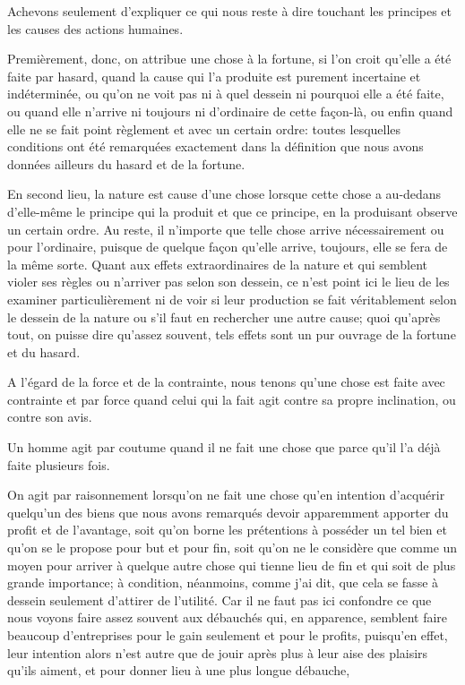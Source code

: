 Achevons seulement d'expliquer ce qui nous reste à dire touchant les principes et les causes des actions humaines.

\bigbreak

Premièrement, donc, on attribue une chose à la fortune, si l'on croit qu'elle a été faite par hasard, quand la cause qui l'a
produite est purement incertaine et indéterminée, ou qu'on ne voit pas ni à quel dessein ni pourquoi elle a été faite, ou quand
elle n'arrive ni toujours ni d'ordinaire de cette façon-là, ou enfin quand elle ne se fait point règlement et avec un certain
ordre: toutes lesquelles conditions ont été remarquées exactement dans la définition que nous avons données ailleurs du hasard
et de la fortune. 

\bigbreak

En second lieu, la nature est cause d'une chose lorsque cette chose a au-dedans d'elle-même le principe qui la produit et
que ce principe, en la produisant observe un certain ordre. Au reste, il n'importe que telle chose arrive nécessairement ou
pour l'ordinaire, puisque de quelque façon qu'elle arrive, toujours, elle se fera de la même sorte. Quant aux effets
extraordinaires de la nature et qui semblent violer ses règles ou n'arriver pas selon son dessein, ce n'est point ici le
lieu de les examiner particulièrement ni de voir si leur production se fait véritablement selon le dessein de la nature ou
s'il faut en rechercher une autre cause; quoi qu'après tout, on puisse dire qu'assez souvent, tels effets sont un pur ouvrage
de la fortune et du hasard.

\bigbreak

A l'égard de la force et de la contrainte, nous tenons qu'une chose est faite avec contrainte et par force quand celui qui la
fait agit contre sa propre inclination, ou contre son avis.

\bigbreak

Un homme agit par coutume quand il ne fait une chose que parce qu'il l'a déjà faite plusieurs fois.

\bigbreak

On agit par raisonnement lorsqu'on ne fait une chose qu'en intention d'acquérir quelqu'un des biens que nous avons remarqués
devoir apparemment apporter du profit et de l'avantage, soit qu'on borne les prétentions à posséder un tel bien et qu'on se le
propose pour but et pour fin, soit qu'on ne le considère que comme un moyen pour arriver à quelque autre chose qui tienne lieu
de fin et qui soit de plus grande importance; à condition, néanmoins, comme j'ai dit, que cela se fasse à dessein seulement
d'attirer de l'utilité. Car il ne faut pas ici confondre ce que nous voyons faire assez souvent aux débauchés qui, en apparence,
semblent faire beaucoup d'entreprises pour le gain seulement et pour le profits, puisqu'en effet, leur intention alors n'est
autre que de jouir après plus à leur aise des plaisirs qu'ils aiment, et pour donner lieu à une plus longue débauche, 

